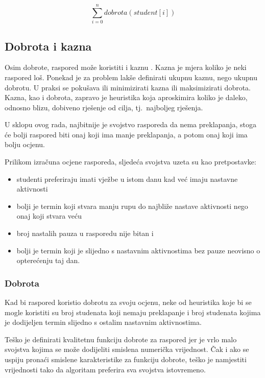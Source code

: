 \documentclass[times, utf8, zavrsni]{fer}
\begin{document}
\begin{equation}
\sum_{i=0}^{n} dobrota(student[i])
\label{eq:dobrota}
\end{equation}

\subsection{Dobrota i kazna}

Osim dobrote, raspored može koristiti i kaznu . Kazna je mjera koliko je neki raspored loš. Ponekad je za problem lakše definirati ukupnu kaznu, nego ukupnu dobrotu. U praksi se pokušava ili minimizirati kazna ili maksimizirati dobrota. Kazna, kao i dobrota, zapravo je heuristika koja aproskimira koliko je daleko, odnosno blizu, dobiveno rješenje od cilja, tj.\ najboljeg rješenja.

U sklopu ovog rada, najbitnije je svojstvo rasporeda da nema preklapanja, stoga će bolji raspored biti onaj koji ima manje preklapanja, a potom onaj koji ima bolju ocjenu.

Prilikom izračuna ocjene rasporeda, sljedeća svojstva uzeta su kao pretpostavke:

\begin{itemize}
	\item studenti preferiraju imati vježbe u istom danu kad već imaju nastavne aktivnosti
	\item bolji je termin koji stvara manju rupu do najbliže nastave aktivnosti nego onaj koji stvara veću
	\item broj nastalih pauza u rasporedu nije bitan i 
	\item bolji je termin koji je slijedno s nastavnim aktivnostima bez pauze neovisno o opterećenju taj dan.
\end{itemize}

\subsubsection{Dobrota}

Kad bi raspored koristio dobrotu za svoju ocjenu, neke od heuristika koje bi se mogle koristiti su broj studenata koji nemaju preklapanje i broj studenata kojima je dodijeljen termin slijedno s ostalim nastavnim aktivnostima.

Teško je definirati kvalitetnu funkciju dobrote za raspored jer je vrlo malo svojstva kojima se može dodijeliti smislena numerička vrijednost. Čak i ako se uspiju pronaći smislene karakteristike za funkciju dobrote, teško je namjestiti vrijednosti tako da algoritam preferira sva svojstva istovremeno.
\end{document}
